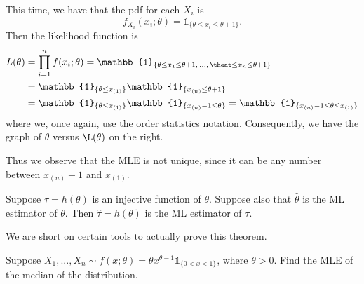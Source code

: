 \documentclass[notoc,notitlepage]{tufte-book}
\begin{document}
\begin{solution}
  This time, we have that the pdf for each $X_i$ is
  \begin{equation*}
    f_{X_i}(x_i ; \theta) = \mathbb{1}_{\{\theta \leq x_i \leq \theta + 1\}}.
  \end{equation*}
  Then the likelihood function is
  \begin{align*}
    L(\theta) &= \prod_{i=1}^{n} f(x_i; \theta) = \mathbb{1}_{\{\theta \leq x_1 \leq \theta + 1, \, ..., \, \theat \leq x_n \leq \theta + 1\}} \\
              &= \mathbb{1}_{\{\theta \leq x_{(1)}\}} \mathbb{1}_{\{ x_{(n)} \leq \theta + 1 \} } \\
              &= \mathbb{1}_{\{\theta \leq x_{(1)}\}} \mathbb{1}_{\{ x_{(n)} - 1 \leq \theta \} } = \mathbb{1}_{\{x_{(n)} - 1 \leq \theta \leq x_{(1)} \}}
  \end{align*}
  where we, once again, use the order statistics notation. Consequently, we have the graph of $\theta$ versus $\L(\theta)$ on the right.

  Thus we observe that the MLE is not unique, since it can be any number between $x_{(n)} - 1$ and $x_{(1)}$.
\end{solution}

\begin{thm}
\label{thm:invariance_property_of_the_mle}
  Suppose $\tau = h(\theta)$ is an injective function of $\theta$. Suppose also that $\hat{\theta}$ is the ML estimator of $\theta$. Then $\hat{\tau} = h(\theta)$ is the ML estimator of $\tau$.
\end{thm}

\begin{warning}
  We are short on certain tools to actually prove this theorem.
\end{warning}

\begin{eg}[Example 6.9]
  Suppose $X_1, ..., X_n \sim f(x; \theta) = \theta x^{\theta - 1} \mathbb{1}_{\{0 < x < 1\}}$, where $\theta > 0$. Find the MLE of the median of the distribution.
\end{eg}
\end{document}
